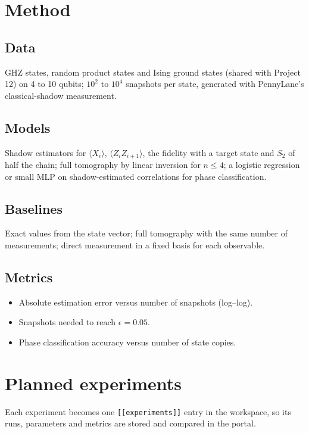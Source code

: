\documentclass[11pt,a4paper]{article}
\begin{document}
\section{Method}
\subsection{Data}
GHZ states, random product states and Ising ground states (shared with Project 12) on 4 to 10 qubits;
$10^2$ to $10^4$ snapshots per state, generated with PennyLane's classical-shadow measurement.

\subsection{Models}
Shadow estimators for $\langle X_i\rangle$, $\langle Z_iZ_{i+1}\rangle$, the fidelity with a target state
and $S_2$ of half the chain; full tomography by linear inversion for $n\le4$; a logistic regression or
small MLP on shadow-estimated correlations for phase classification.

\subsection{Baselines}
Exact values from the state vector; full tomography with the same number of measurements; direct
measurement in a fixed basis for each observable.

\subsection{Metrics}
\begin{itemize}
  \item Absolute estimation error versus number of snapshots (log--log).
  \item Snapshots needed to reach $\epsilon=0.05$.
  \item Phase classification accuracy versus number of state copies.
\end{itemize}

\section{Planned experiments}
Each experiment becomes one \texttt{[[experiments]]} entry in the workspace, so its runs, parameters
and metrics are stored and compared in the portal.
\end{document}
